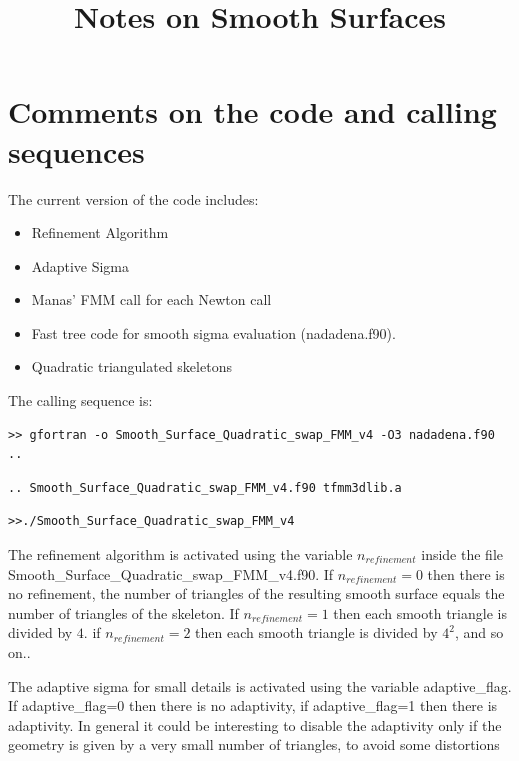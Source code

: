 \documentclass[11pt, oneside]{article}   	%
\title{Notes on Smooth Surfaces}
\begin{document}
\maketitle

\section{Comments on the code and calling sequences}

The current version of the code includes:
\begin{itemize}
\item Refinement Algorithm
\item Adaptive Sigma
\item Manas' FMM call for each Newton call
\item Fast tree code for smooth sigma evaluation (nadadena.f90).
\item Quadratic triangulated skeletons
\end{itemize}

The calling sequence is:

\begin{verbatim}>> gfortran -o Smooth_Surface_Quadratic_swap_FMM_v4 -O3 nadadena.f90 ..\end{verbatim}
\begin{verbatim}.. Smooth_Surface_Quadratic_swap_FMM_v4.f90 tfmm3dlib.a\end{verbatim}
\begin{verbatim}>>./Smooth_Surface_Quadratic_swap_FMM_v4 \end{verbatim}

The refinement algorithm is activated using the variable $n_{refinement}$ inside the file Smooth\_Surface\_Quadratic\_swap\_FMM\_v4.f90. If $n_{refinement}=0$ then there is no refinement, the number of triangles of the resulting smooth surface equals the number of triangles of the skeleton. If $n_{refinement}=1$ then each smooth triangle is divided by $4$. if $n_{refinement}=2$ then each smooth triangle is divided by $4^2$, and so on..

The adaptive sigma for small details is activated using the variable adaptive\_flag. If adaptive\_flag=0 then there is no adaptivity, if adaptive\_flag=1 then there is adaptivity. In general it could be interesting to disable the adaptivity only if the geometry is given by a very small number of triangles, to avoid some distortions
\end{document}
